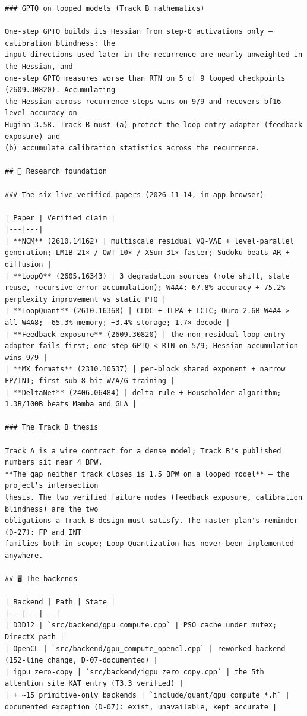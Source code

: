 \begin{Verbatim}[breaklines,breakanywhere,fontsize=\footnotesize]
### GPTQ on looped models (Track B mathematics)

One-step GPTQ builds its Hessian from step-0 activations only — calibration blindness: the
input directions used later in the recurrence are nearly unweighted in the Hessian, and
one-step GPTQ measures worse than RTN on 5 of 9 looped checkpoints (2609.30820). Accumulating
the Hessian across recurrence steps wins on 9/9 and recovers bf16-level accuracy on
Huginn-3.5B. Track B must (a) protect the loop-entry adapter (feedback exposure) and
(b) accumulate calibration statistics across the recurrence.

## 🔬 Research foundation

### The six live-verified papers (2026-11-14, in-app browser)

| Paper | Verified claim |
|---|---|
| **NCM** (2610.14162) | multiscale residual VQ-VAE + level-parallel generation; LM1B 21× / OWT 10× / XSum 31× faster; Sudoku beats AR + diffusion |
| **LoopQ** (2605.16343) | 3 degradation sources (role shift, state reuse, recursive error accumulation); W4A4: 67.8% accuracy + 75.2% perplexity improvement vs static PTQ |
| **LoopQuant** (2610.16368) | CLDC + ILPA + LCTC; Ouro-2.6B W4A4 > all W4A8; −65.3% memory; +3.4% storage; 1.7× decode |
| **Feedback exposure** (2609.30820) | the non-residual loop-entry adapter fails first; one-step GPTQ < RTN on 5/9; Hessian accumulation wins 9/9 |
| **MX formats** (2310.10537) | per-block shared exponent + narrow FP/INT; first sub-8-bit W/A/G training |
| **DeltaNet** (2406.06484) | delta rule + Householder algorithm; 1.3B/100B beats Mamba and GLA |

### The Track B thesis

Track A is a wire contract for a dense model; Track B's published numbers sit near 4 BPW.
**The gap neither track closes is 1.5 BPW on a looped model** — the project's intersection
thesis. The two verified failure modes (feedback exposure, calibration blindness) are the two
obligations a Track-B design must satisfy. The master plan's reminder (D-27): FP and INT
families both in scope; Loop Quantization has never been implemented anywhere.

## 🖥️ The backends

| Backend | Path | State |
|---|---|---|
| D3D12 | `src/backend/gpu_compute.cpp` | PSO cache under mutex; DirectX path |
| OpenCL | `src/backend/gpu_compute_opencl.cpp` | reworked backend (152-line change, D-07-documented) |
| igpu zero-copy | `src/backend/igpu_zero_copy.cpp` | the 5th attention site KAT entry (T3.3 verified) |
| + ~15 primitive-only backends | `include/quant/gpu_compute_*.h` | documented exception (D-07): exist, unavailable, kept accurate |


\end{Verbatim}
